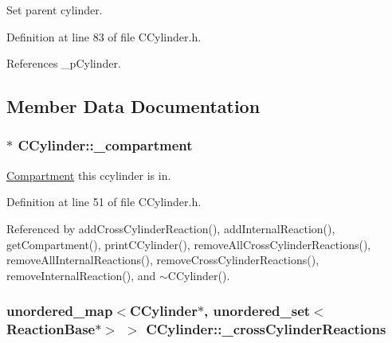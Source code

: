 Set parent cylinder. 



Definition at line 83 of file C\+Cylinder.\+h.



References \+\_\+p\+Cylinder.



\subsection{Member Data Documentation}
\hypertarget{classCCylinder_ad8a1a406025aa82a072215aeb645c8c1}{
\subsubsection[{\+\_\+compartment}]{$\ast$ C\+Cylinder\+::\+\_\+compartment\hspace{0.3cm}{\ttfamily [private]}}}\label{classCCylinder_ad8a1a406025aa82a072215aeb645c8c1}


\hyperlink{classCompartment}{Compartment} this ccylinder is in. 



Definition at line 51 of file C\+Cylinder.\+h.



Referenced by add\+Cross\+Cylinder\+Reaction(), add\+Internal\+Reaction(), get\+Compartment(), print\+C\+Cylinder(), remove\+All\+Cross\+Cylinder\+Reactions(), remove\+All\+Internal\+Reactions(), remove\+Cross\+Cylinder\+Reactions(), remove\+Internal\+Reaction(), and $\sim$\+C\+Cylinder().

\hypertarget{classCCylinder_a4263400be58cd0e11e0be99a42595c88}{
\subsubsection[{\+\_\+cross\+Cylinder\+Reactions}]{\setlength{\rightskip}{0pt plus 5cm}unordered\+\_\+map$<${\bf C\+Cylinder}$\ast$, unordered\+\_\+set$<${\bf Reaction\+Base}$\ast$$>$ $>$ C\+Cylinder\+::\+\_\+cross\+Cylinder\+Reactions\hspace{0.3cm}{\ttfamily [private]}}}\label{classCCylinder_a4263400be58cd0e11e0be99a42595c88}


